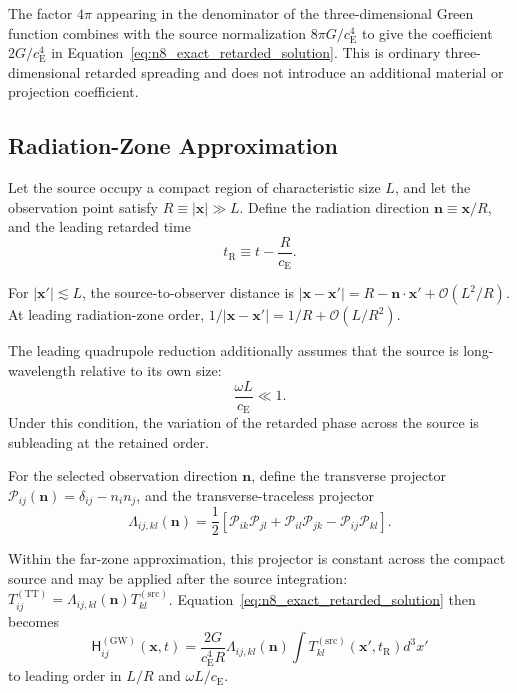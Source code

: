 The factor $4\pi$ appearing in the denominator of the three-dimensional Green function combines with the source normalization $8\pi G/c_{\mathrm{E}}^{4}$ to give the coefficient $2G/c_{\mathrm{E}}^{4}$ in Equation~\eqref{eq:n8_exact_retarded_solution}. This is ordinary three-dimensional retarded spreading and does not introduce an additional material or projection coefficient.

\subsection{Radiation-Zone Approximation}
\label{subsec:n8_radiation_zone}

Let the source occupy a compact region of characteristic size $L$, and let the observation point satisfy $R \equiv |\mathbf{x}| \gg L$. Define the radiation direction $\mathbf{n} \equiv \mathbf{x}/R$, and the leading retarded time
\begin{equation}
    t_{\mathrm{R}} \equiv t-\frac{R}{c_{\mathrm{E}}}.
    \label{eq:n8_retarded_time}
\end{equation}

For $|\mathbf{x}'| \lesssim L$, the source-to-observer distance is $|\mathbf{x}-\mathbf{x}'| = R - \mathbf{n}\cdot\mathbf{x}' + \mathcal{O} \left( L^{2}/R \right)$. At leading radiation-zone order, $1 / |\mathbf{x}-\mathbf{x}'| = 1/R + \mathcal{O} \left( L/R^{2} \right)$.

The leading quadrupole reduction additionally assumes that the source is long-wavelength relative to its own size:
\begin{equation}
    \frac{\omega L}{c_{\mathrm{E}}} \ll 1.
    \label{eq:n8_long_wavelength_source_condition}
\end{equation}
Under this condition, the variation of the retarded phase across the source is subleading at the retained order.

For the selected observation direction $\mathbf{n}$, define the transverse projector $\mathcal{P}_{ij}(\mathbf{n}) = \delta_{ij} - n_{i}n_{j}$, and the transverse-traceless projector
\begin{equation}
    \Lambda_{ij,kl}(\mathbf{n}) = \frac{1}{2} \left[ \mathcal{P}_{ik}\mathcal{P}_{jl} + \mathcal{P}_{il}\mathcal{P}_{jk} - \mathcal{P}_{ij}\mathcal{P}_{kl} \right].
    \label{eq:n8_tt_projector}
\end{equation}

Within the far-zone approximation, this projector is constant across the compact source and may be applied after the source integration: $T_{ij}^{(\mathrm{TT})} = \Lambda_{ij,kl}(\mathbf{n}) T_{kl}^{(\mathrm{src})}$. Equation~\eqref{eq:n8_exact_retarded_solution} then becomes
\begin{equation}
    \mathsf{H}_{ij}^{(\mathrm{GW})} (\mathbf{x},t) = \frac{2G}{ c_{\mathrm{E}}^{4}R } \Lambda_{ij,kl}(\mathbf{n}) \int T_{kl}^{(\mathrm{src})} \left( \mathbf{x}', t_{\mathrm{R}} \right) d^{3}x'
    \label{eq:n8_far_zone_stress_field}
\end{equation}
to leading order in $L/R$ and $\omega L/c_{\mathrm{E}}$.


